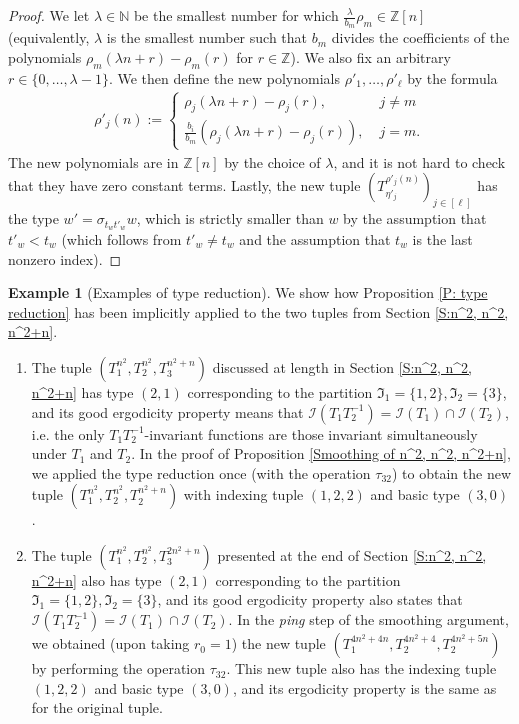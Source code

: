 \documentclass[11pt]{amsart}
\theoremstyle{definition}
\newtheorem{example}{Example}
\newcommand{\N}{{\mathbb N}}
\newcommand{\Z}{{\mathbb Z}}
\newcommand{\CI}{{\mathcal I}}
\newcommand{\FI}{{\mathfrak I}}
\newcommand{\inv}{^{-1}}
\newcommand{\brac}[1]{\mathopen{}\left( #1 \mathclose{}\right)}
\begin{document}
\begin{proof}
We let $\lambda\in\N$ be the smallest number for which $\frac{\lambda}{b_m}\rho_m\in\Z[n]$ (equivalently, $\lambda$ is the smallest number such that $b_m$ divides the coefficients of the polynomials $\rho_m(\lambda n + r) - \rho_m(r)$ for $r\in\Z$). We also fix an arbitrary $r\in\{0, \ldots, \lambda-1\}$. We then define the new polynomials $\rho'_1, \ldots, \rho'_\ell$ by the formula
\begin{align*}
    \rho'_{j}(n) := \begin{cases} \rho_{j}(\lambda n + r) - \rho_{j}(r),\; &j\neq m\\ \frac{b_{i}}{b_{m}}(\rho_j(\lambda n + r) - \rho_j(r)),\; &j= m. \end{cases}
\end{align*}
The new polynomials are in $\Z[n]$ by the choice of $\lambda$, and it is not hard to check that they have zero constant terms.
Lastly, the new tuple $\brac{T_{\eta'_j}^{\rho'_j(n)}}_{j\in[\ell]}$ has the type $w' = \sigma_{t_w t'_w}w$, which is strictly  smaller than $w$ by the assumption that $t'_w<t_w$ (which follows from $t'_w\neq t_w$ and the assumption that $t_w$ is the last nonzero index).
\end{proof}






\begin{example}[Examples of type reduction]\label{Ex: type reduction for earlier examples}
We show how Proposition \ref{P: type reduction} has been implicitly applied to  the two tuples from Section \ref{S:n^2, n^2, n^2+n}.
\begin{enumerate}
    \item The tuple $(T_1^{n^2}, T_2^{n^2}, T_3^{n^2+n})$ discussed at length in Section \ref{S:n^2, n^2, n^2+n} has type $(2, 1)$ corresponding to the partition $\FI_1 = \{1,2\}, \FI_2 = \{3\}$, and its good ergodicity property means that $\CI(T_1 T_2\inv)=\CI(T_1)\cap\CI(T_2)$, i.e. the only $T_1 T_2\inv$-invariant functions are those invariant simultaneously under $T_1$ and $T_2$. In the proof of Proposition \ref{Smoothing of n^2, n^2, n^2+n}, we applied the type reduction once (with the operation $\tau_{32}$) to obtain the new tuple $(T_1^{n^2}, T_2^{n^2}, T_2^{n^2+n})$ with indexing tuple $(1,2,2)$ and basic type $(3,0)$.
    \item The tuple $(T_1^{n^2}, T_2^{n^2}, T_3^{2n^2+n})$ presented at the end of Section \ref{S:n^2, n^2, n^2+n} also has type $(2, 1)$ corresponding to the partition $\FI_1 = \{1,2\}, \FI_2 = \{3\}$, and its good ergodicity property also states that $\CI(T_1 T_2\inv)=\CI(T_1)\cap\CI(T_2)$. In the \textit{ping} step of the smoothing argument, we obtained  (upon taking $r_0 = 1$) the new tuple $(T_1^{4n^2+4n}, T_2^{4n^2+4}, T_2^{4n^2+5n})$ by performing the operation $\tau_{32}$. This new tuple also has the indexing tuple $(1,2,2)$ and basic type $(3,0)$, and its ergodicity property is the same as for the original tuple.
\end{enumerate}
\end{example}
\end{document}
